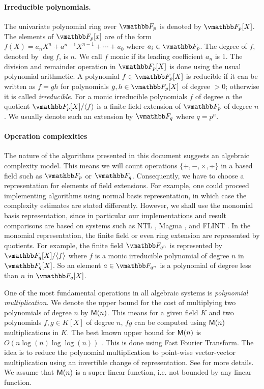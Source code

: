 \paragraph{Irreducible polynomials.}
The univariate polynomial ring over $\F_p$ is denoted by $\F_p[X]$. The elements of $\F_p[x]$ are 
of the form $f(X) = a_{n}X^n + a^{n - 1}X^{n - 1} + \cdots + a_0$ where $a_i \in \F_p$. The degree 
of $f$, denoted by $\deg f$, is $n$. We call $f$ monic if its leading coefficient $a_n$ is 1. The 
division and remainder operation in $\F_p[X]$ is done using the usual polynomial arithmetic. A 
polynomial $f \in \F_p[X]$ is reducible if it can be written as $f = gh$ for polynomials $g, h \in 
\F_p[X]$ of degree $> 0$; otherwise it is called \textit{irreducible}. For a monic irreducible 
polynomials $f$ of degree $n$ the quotient $\F_p[X] / \ang{f}$ is a finite field extension of 
$\F_p$ of degree $n$. We usually denote such an extension by $\F_q$ where $q = p^n$.  

\paragraph{Operation complexities}
The nature of the algorithms presented in this document suggests an algebraic complexity model. 
This means we will count operations $\{+, -, \times, \div \}$ in a based field such as $\F_p$ or 
$\F_q$. Consequently, we have to choose a representation for elements of field extensions. For 
example, one could proceed implementing algorithms using normal basis representation, in which 
case the complexity estimates are stated differently. However, we shall use the monomial basis 
representation, since in particular our implementations and result comparisons are based on 
systems such as NTL \cite{shoup2003ntl}, Magma \cite{MAGMA}, and FLINT \cite{hart2010flint}. In 
the monomial representation, the finite field or even ring extension are represented by quotients. 
For example, the finite field $\F_{q^n}$ is represented by $\F_q[X] / \ang{f}$ where $f$ is a 
monic irreducible polynomial of degree $n$ in $\F_q[X]$. So an element $a \in \F_{q^n}$ is a 
polynomial of degree less than $n$ in $\F_q[X]$. 

One of the most fundamental operations in all algebraic systems is \textit{polynomial 
multiplication}. We denote the upper bound for the cost of multiplying two polynomials of degree 
$n$ by $\mathsf{M}(n)$. This means for a given field $K$ and two polynomials $f, g \in K[X]$ of degree 
$n$, $fg$ can be computed using $\mathsf{M}(n)$ multiplications in $K$. The best known upper bound for 
$\mathsf{M}(n)$ is $O(n\log(n)\log\log(n))$ \cite{Schonhage1971,CaKa91}. This is done using Fast Fourier 
Transform. The idea is to reduce the polynomial multiplication to point-wise vector-vector 
multiplication using an invertible change of representation. See \cite[Chapter~8]{GaGe03} for more 
details. We assume that $\mathsf{M}(n)$ is a super-linear function, i.e. not bounded by any linear 
function.


